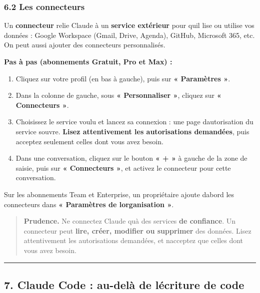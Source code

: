 \documentclass[
  french,
  11pt,
  a4paper,
]{article}
\providecommand{\tightlist}{%
  \setlength{\itemsep}{0pt}\setlength{\parskip}{0pt}}
\begin{document}
\subsubsection{6.2 Les connecteurs}\label{62-les-connecteurs}

Un \textbf{connecteur} relie Claude à un \textbf{service extérieur} pour
qu\textquotesingle il lise ou utilise vos données : Google Workspace
(Gmail, Drive, Agenda), GitHub, Microsoft 365, etc. On peut aussi
ajouter des connecteurs personnalisés.

\textbf{Pas à pas (abonnements Gratuit, Pro et Max) :}

\begin{enumerate}
\def\labelenumi{\arabic{enumi}.}
\tightlist
\item
  Cliquez sur votre profil (en bas à gauche), puis sur \textbf{«
  Paramètres »}.
\item
  Dans la colonne de gauche, sous \textbf{« Personnaliser »}, cliquez
  sur \textbf{« Connecteurs »}.
\item
  Choisissez le service voulu et lancez sa connexion : une page
  d\textquotesingle autorisation du service s\textquotesingle ouvre.
  \textbf{Lisez attentivement les autorisations demandées}, puis
  acceptez seulement celles dont vous avez besoin.
\item
  Dans une conversation, cliquez sur le bouton \textbf{« + »} à gauche
  de la zone de saisie, puis sur \textbf{« Connecteurs »}, et activez le
  connecteur pour cette conversation.
\end{enumerate}

Sur les abonnements Team et Enterprise, un propriétaire ajoute
d\textquotesingle abord les connecteurs dans \textbf{« Paramètres de
l\textquotesingle organisation »}.

\begin{quote}
\textbf{Prudence.} Ne connectez Claude qu\textquotesingle à des services
\textbf{de confiance}. Un connecteur peut \textbf{lire, créer, modifier
ou supprimer} des données. Lisez attentivement les autorisations
demandées, et n\textquotesingle acceptez que celles dont vous avez
besoin.
\end{quote}

\begin{center}\rule{0.5\linewidth}{0.5pt}\end{center}

\subsection{7. Claude Code : au-delà de l\textquotesingle écriture de
code}\label{7-claude-code--au-deluxe0-de-luxe9criture-de-code}
\end{document}
